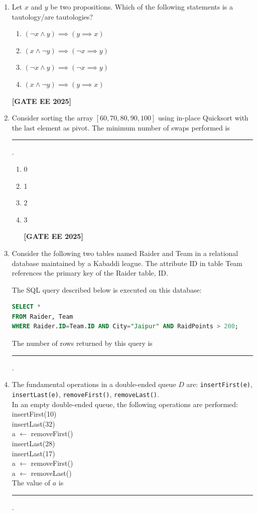 \documentclass[journal]{IEEEtran}
\newcommand{\qfooter}{%
  \begin{flushright}\footnotesize\textbf{[GATE EE 2025]}\end{flushright}\vspace{1em}%
}
\begin{document}
\begin{enumerate}
\item Let $x$ and $y$ be two propositions. Which of the following statements is a tautology/are tautologies?
\begin{multicols}{2}
\begin{enumerate}
\item $(\neg x \land y) \implies (y \implies x)$
\item $(x\land \neg y) \implies (\neg x \implies y)$
\item $(\neg x \land y) \implies (\neg x \implies y)$
\item $(x\land \neg y) \implies (y \implies x)$
\end{enumerate} \qfooter
\end{multicols}

\item Consider sorting the array $[60, 70, 80, 90, 100]$ using in-place Quicksort with the last element as pivot. The minimum number of swaps performed is \rule{2cm}{0.15mm}.
\begin{enumerate}
\item 0
\item 1
\item 2
\item 3
\qfooter
\end{enumerate}


\item Consider the following two tables named Raider and Team in a relational database maintained by a Kabaddi league. The attribute ID in table Team references the primary key of the Raider table, ID.



The SQL query described below is executed on this database:
\begin{lstlisting}[language=SQL]
SELECT *
FROM Raider, Team
WHERE Raider.ID=Team.ID AND City="Jaipur" AND RaidPoints > 200;
\end{lstlisting}
The number of rows returned by this query is \rule{5em}{0.07em}.

\item The fundamental operations in a double-ended queue $D$ are: \texttt{insertFirst(e)}, \texttt{insertLast(e)}, \texttt{removeFirst()}, \texttt{removeLast()}.\\
In an empty double-ended queue, the following operations are performed: \\
insertFirst(10)\\
insertLast(32)\\
a $\leftarrow$ removeFirst()\\
insertLast(28)\\
insertLast(17)\\
a $\leftarrow$ removeFirst()\\
a $\leftarrow$ removeLast()\\
The value of $a$ is \rule{5em}{0.07em}.


\end{enumerate}
\end{document}
